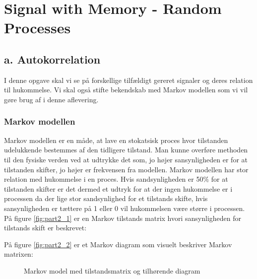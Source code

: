 \chapter{Signal with Memory - Random Processes}
\label{ch:part2}

\section{a. Autokorrelation}
I denne opgave skal vi se på forskellige tilfældigt gereret signaler og deres relation til hukommelse. Vi skal også stifte bekendskab med Markov modellen som vi vil gøre brug af i denne aflevering.\\
\subsection{Markov modellen}
Markov modellen er en måde, at lave en stokatsisk proces hvor tilstanden udelukkende bestemmes af den tidligere tilstand. Man kunne overføre methoden til den fysiske verden ved at udtrykke det som, jo højer sansynligheden er for at tilstanden skifter, jo højer er frekvensen fra modellen. Markov modellen har stor relation med hukommelse i en proces. Hvis sandsynligheden er 50$\%$ for at tilstanden skifter er det dermed et udtryk for at der ingen hukommelse er i processen da der lige stor sandsynlighed for et tilstands skifte, hvis sansynligheden er tættere på 1 eller 0 vil hukommelsen være større i processen. \\

 På figure \ref{fig:part2_1} er en Markov tilstands matrix hvori sansynligheden for tilstands skift er beskrevet:  

På figure \ref{fig:part2_2} er et Markov diagram som visuelt beskriver Markov matrixen:

 \begin{figure}[!h]
	\centering
	\caption{Markov model med tilstandsmatrix og tilhørende diagram}
	\label{fig:part2_markov}
\end{figure}
 

